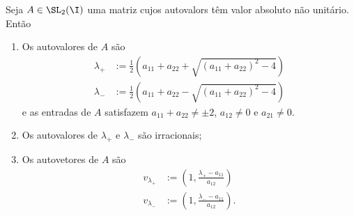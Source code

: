 \begin{proposition}
Seja $A \in \SL_2(\I)$ uma matriz cujos autovalors têm valor absoluto não unitário. Então
	\begin{enumerate}
	\item Os autovalores de $A$ são
		\begin{align*}
		\lambda_+ &:= \frac{1}{2}\left(a_{11}+a_{22} + \sqrt{(a_{11}+a_{22})^2 - 4}\right) \\
		\lambda_- &:= \frac{1}{2}\left(a_{11}+a_{22} - \sqrt{(a_{11}+a_{22})^2 - 4}\right)
		\end{align*}
e as entradas de $A$ satisfazem $a_{11}+a_{22} \neq \pm 2$, $a_{12} \neq 0$ e $a_{21} \neq 0$.
	\item Os autovalores de $\lambda_+$ e $\lambda_-$ são irracionais;
	\item Os autovetores de $A$ são
	\begin{align*}
	v_{\lambda_+} &:= \left(1, \frac{\lambda_+ -a_{11}}{a_{12}}\right) \\
	 v_{\lambda_-} &:= \left(1, \frac{\lambda_- -a_{11}}{a_{12}}\right) .
	\end{align*}
	\end{enumerate}


	\end{proposition}
